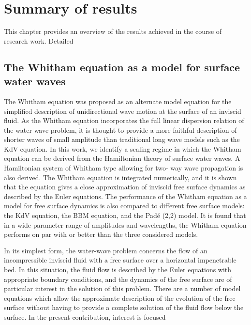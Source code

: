 \chapter{Summary of results}

This chapter provides an overview of the results achieved in the course of research work. 
Detailed 

\section{The Whitham equation as a model for surface water waves}

The Whitham equation was proposed as an alternate model equation for the simplified description of unidirectional 
wave motion at the surface of an inviscid fluid. As the Whitham equation incorporates the full
linear dispersion relation of the water wave problem, it is thought to provide a more faithful description
of shorter waves of small amplitude than traditional long wave models such as the KdV equation.
In this work, we identify a scaling regime in which the Whitham equation can be derived from the
Hamiltonian theory of surface water waves. A Hamiltonian system of Whitham type allowing for two-
way wave propagation is also derived. The Whitham equation is integrated numerically, and it is shown
that the equation gives a close approximation of inviscid free surface dynamics as described by the
Euler equations. The performance of the Whitham equation as a model for free surface dynamics is also
compared to different free surface models: the KdV equation, the BBM equation, and the Pad\'e (2,2) model.
It is found that in a wide parameter range of amplitudes and wavelengths, the Whitham equation performs
on par with or better than the three considered models.


In its simplest form, the water-wave problem concerns the
flow of an incompressible inviscid fluid with a free surface over
a horizontal impenetrable bed. In this situation, the fluid flow
is described by the Euler equations with appropriate boundary
conditions, and the dynamics of the free surface are of particular
interest in the solution of this problem.
There are a number of model equations which allow the
approximate description of the evolution of the free surface
without having to provide a complete solution of the fluid flow
below the surface. In the present contribution, interest is focused

